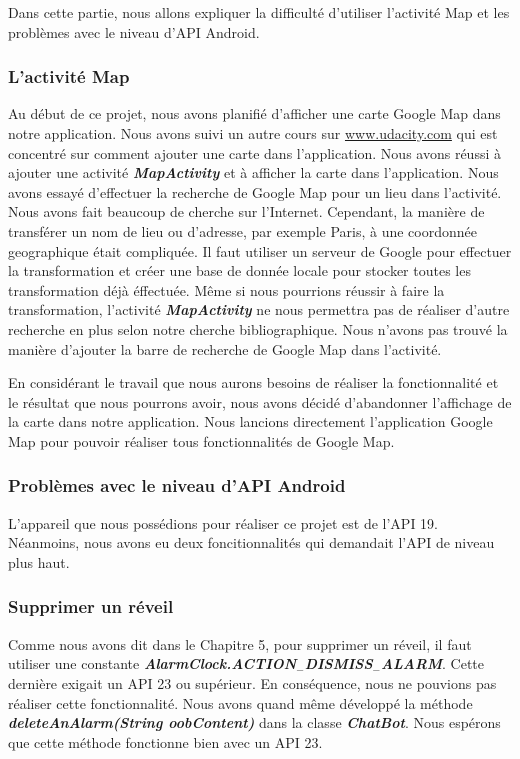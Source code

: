 \indent Dans cette partie, nous allons expliquer la difficulté d'utiliser l'activité Map et les problèmes avec le niveau d'API Android.

\subsubsection{L'activité Map}

\indent Au début de ce projet, nous avons planifié d'afficher une carte Google Map dans notre application. Nous avons suivi un autre cours sur \url{www.udacity.com} qui est concentré sur comment ajouter une carte dans l'application. Nous avons réussi à ajouter une activité \textbf{\emph{MapActivity}} et à afficher la carte dans l'application. Nous avons essayé d'effectuer la recherche de Google Map pour un lieu dans l'activité. Nous avons fait beaucoup de cherche sur l'Internet. Cependant, la manière de transférer un nom de lieu ou d'adresse, par exemple Paris, à une coordonnée geographique était compliquée. Il faut utiliser un serveur de Google pour effectuer la transformation et créer une base de donnée locale pour stocker toutes les transformation déjà éffectuée. Même si nous pourrions réussir à faire la transformation, l'activité \textbf{\emph{MapActivity}} ne nous permettra pas de réaliser d'autre recherche en plus selon notre cherche bibliographique. Nous n'avons pas trouvé la manière d'ajouter la barre de recherche de Google Map dans l'activité.

\indent En considérant le travail que nous aurons besoins de réaliser la fonctionnalité et le résultat que nous pourrons avoir, nous avons décidé d'abandonner l'affichage de la carte dans notre application. Nous lancions directement l'application Google Map pour pouvoir réaliser tous fonctionnalités de Google Map.

\subsubsection{Problèmes avec le niveau d'API Android}

\indent L'appareil que nous possédions pour réaliser ce projet est de l'API 19. Néanmoins, nous avons eu deux foncitionnalités qui demandait l'API de niveau plus haut.

\subsubsection{Supprimer un réveil}

\indent Comme nous avons dit dans le Chapitre 5, pour supprimer un réveil, il faut utiliser une constante \textbf{\emph{AlarmClock.ACTION$_-$DISMISS$_-$ALARM}}. Cette dernière exigait un API 23 ou supérieur. En conséquence, nous ne pouvions pas réaliser cette fonctionnalité. Nous avons quand même développé la méthode \textbf{\emph{deleteAnAlarm(String oobContent)}} dans la classe \textbf{\emph{ChatBot}}. Nous espérons que cette méthode fonctionne bien avec un API 23.

